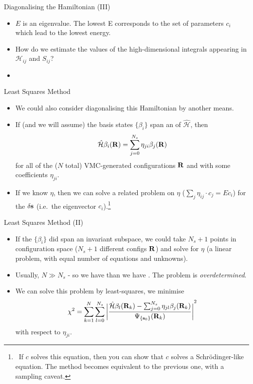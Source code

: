 \documentclass[12pt, pdf, hyperref={draft}, usenames, dvipsnames,
aspectratio=169]{beamer}
\newcommand{\red}[1]{{\bf\color{LancsRed}{#1}}}
\newcommand{\blue}[1]{{\bf\color{NavyBlue}{#1}}}
\newcommand{\green}[1]{{\bf\color{ForestGreen}{#1}}}
\begin{document}
\begin{frame}{Diagonalising the Hamiltonian (III)}
\begin{itemize}
  \item $E$ is an eigenvalue. The lowest E corresponds to the set of
  parameters $c_i$ which lead to the lowest energy.
  \item How do we estimate the values of the high-dimensional integrals
  appearing in $\mathcal{H}_{ij}$ and $S_{ij}$? \blue{You tell me.} \pause{}
  \item \green{VMC!}
\end{itemize}
\end{frame}


\begin{frame}{Least Squares Method}
\begin{itemize}
  \item We could also consider diagonalising this Hamiltonian by another
  means.
  \item If (and we will assume) the basis states $\{ \beta_i \}$ span an
  \blue{invariant subspace} of $\mathcal{\hat H}$, then
  \begin{equation}
    \mathcal{\hat H} \beta_i({\bf R}) = \sum^{N_s}_{j=0} \eta_{ji} \beta_j({\bf
    R})
  \end{equation}
  for all of the ($N$ total) VMC-generated configurations ${\bf R}$ and with
  some coefficients $\eta_{ji}$.
  \item If we know $\eta$, then we can solve a related problem on $\eta$
  ($\sum_j \eta_{ij}\cdot c_j = Ec_{i}$) for the $\delta {\bf s}$ (i.e.\ the
  eigenvector $c_i$).\footnote{\ If $c$ solves this equation, then you can show
  that $c$ solves a Schr\"{o}dinger-like equation. The method becomes
  equivalent to the previous one, with a sampling caveat.}
\end{itemize}
\end{frame}


\begin{frame}{Least Squares Method (II)}
\begin{itemize}
  \item If the $\{\beta_i\}$ did span an invariant subspace, we could take
  \green{any} $N_s+1$ points in configuration space ($N_s+1$ different configs
  ${\bf R}$) and solve for $\eta$ (a linear problem, with equal number of
  equations and unknowns).
  \item Usually, $N \gg N_s$ - so we have \green{far more equations} than we have
  \red{unknowns}. The problem is \textit{overdetermined}.
  \item We can solve this problem by least-squares, we minimise
  \begin{equation}
    \chi^2 = \sum^{N}_{k=1} \sum^{N_s}_{l=0} {\bigg\lvert
    \dfrac{\mathcal{\hat H} \beta_l({\bf R}_k) -
    \sum^{N_s}_{j=0}\eta_{jl}\beta_j({\bf R}_k)}
    {\Psi_{\{ {\bf s}_0 \}}({\bf R}_k)}
    \bigg\rvert}^{2}
  \end{equation}
  with respect to $\eta_{ji}$.
\end{itemize}
\end{frame}
\end{document}

